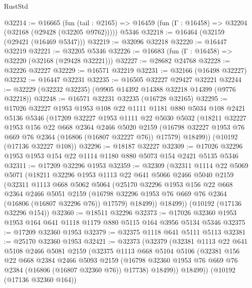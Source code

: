 \begin{lexlean}{RustStd}
\begin{coremodule}
@32214 := @16665
    (fun (tail : @2165) => @16459 (fun (Γ : @16458) => @32204 (@32168 (@29428 (@32205 @9762)))))
    @5346
@32218 := @16464 (@32159 (@29421 (@16469 @5347)))
@32219 := @32096 @32218
@32220 := @16447 @32219
@32221 := @32205 @5346
@32226 := @16683 (fun (Γ : @16458) => @32220 (@32168 (@29428 @32221)))
@32227 := @28682 @24768
@32228 := @32226 @32227
@32229 := @16571 @32219
@32231 := @32166 (@16498 @32227)
@32232 := @16447 @32231
@32235 := @16505 @32227 @29427 @32221
@32244 := @32229 (@32232 @32235) (@9905 @14392 @14388 @32218 @14399 (@9776 @32218))
@32248 := @16571 @32231 @32235 (@16728 @32165)
@32295 := @17026
    @32227
    @1953
    @1953
    @108
    @22
    @1111
    @1181
    @880
    @5034
    @108
    @2421
    @5136
    @5346
    (@17209
      @32227
      @1953
      @1111
      @22
      @5030
      @5032
      (@18211
        @32227
        @1953
        @156
        @22
        @668
        @2364
        @2466
        @5020
        @2159
        (@16798 @32227 @1953 @76 @669 @76 @2364 (@16806 (@16807 @32227 @76)) @17579)
        @18499))
    (@10192 (@17136 @32227 @108))
@32296 := @18187 @32227
@32309 := @17026 @32296 @1953 @1953 @154 @22 @1114 @1180 @880 @5073 @154 @2421 @5135 @5346
@32311 := @17209 @32296 @1953
@32359 := @32309
    (@32311
      @1114
      @22
      @5069
      @5071
      (@18211
        @32296
        @1953
        @1113
        @22
        @641
        @5066
        @2466
        @5040
        @2159
        (@32311
          @1113
          @668
          @5062
          @5064
          (@25170
            @32296
            @1953
            @156
            @22
            @668
            @2364
            @2466
            @5051
            @2159
            (@16798 @32296 @1953 @76 @669 @76 @2364 (@16806 (@16807 @32296 @76)) @17579)
            @18499))
        @18499))
    (@10192 (@17136 @32296 @154))
@32360 := @18511 @32296
@32373 := @17026 @32360 @1953 @1953 @164 @641 @1118 @1179 @880 @5115 @164 @3956 @5134 @5346
@32375 := @17209 @32360 @1953
@32379 := @32375 @1118 @641 @5111 @5113
@32381 := @25170 @32360 @1953
@32421 := @32373
    (@32379
      (@32381
        @1113
        @22
        @641
        @5108
        @2466
        @5081
        @2159
        (@32375
          @1113
          @668
          @5104
          @5106
          (@32381
            @156
            @22
            @668
            @2384
            @2466
            @5093
            @2159
            (@16798 @32360 @1953 @76 @669 @76 @2384 (@16806 (@16807 @32360 @76)) @17738)
            @18499))
        @18499))
    (@10192 (@17136 @32360 @164))

\end{coremodule}
\end{lexlean}
